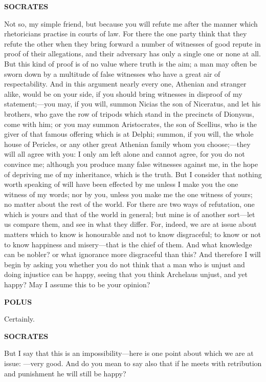 \documentclass[11pt,letter]{article}
\begin{document}
\par \textbf{SOCRATES}
\par   Not so, my simple friend, but because you will refute me after the manner which rhetoricians practise in courts of law. For there the one party think that they refute the other when they bring forward a number of witnesses of good repute in proof of their allegations, and their adversary has only a single one or none at all. But this kind of proof is of no value where truth is the aim; a man may often be sworn down by a multitude of false witnesses who have a great air of respectability. And in this argument nearly every one, Athenian and stranger alike, would be on your side, if you should bring witnesses in disproof of my statement;—you may, if you will, summon Nicias the son of Niceratus, and let his brothers, who gave the row of tripods which stand in the precincts of Dionysus, come with him; or you may summon Aristocrates, the son of Scellius, who is the giver of that famous offering which is at Delphi; summon, if you will, the whole house of Pericles, or any other great Athenian family whom you choose;—they will all agree with you:  I only am left alone and cannot agree, for you do not convince me; although you produce many false witnesses against me, in the hope of depriving me of my inheritance, which is the truth. But I consider that nothing worth speaking of will have been effected by me unless I make you the one witness of my words; nor by you, unless you make me the one witness of yours; no matter about the rest of the world. For there are two ways of refutation, one which is yours and that of the world in general; but mine is of another sort—let us compare them, and see in what they differ. For, indeed, we are at issue about matters which to know is honourable and not to know disgraceful; to know or not to know happiness and misery—that is the chief of them. And what knowledge can be nobler? or what ignorance more disgraceful than this? And therefore I will begin by asking you whether you do not think that a man who is unjust and doing injustice can be happy, seeing that you think Archelaus unjust, and yet happy? May I assume this to be your opinion?

\par \textbf{POLUS}
\par   Certainly.

\par \textbf{SOCRATES}
\par   But I say that this is an impossibility—here is one point about which we are at issue: —very good. And do you mean to say also that if he meets with retribution and punishment he will still be happy?
\end{document}
